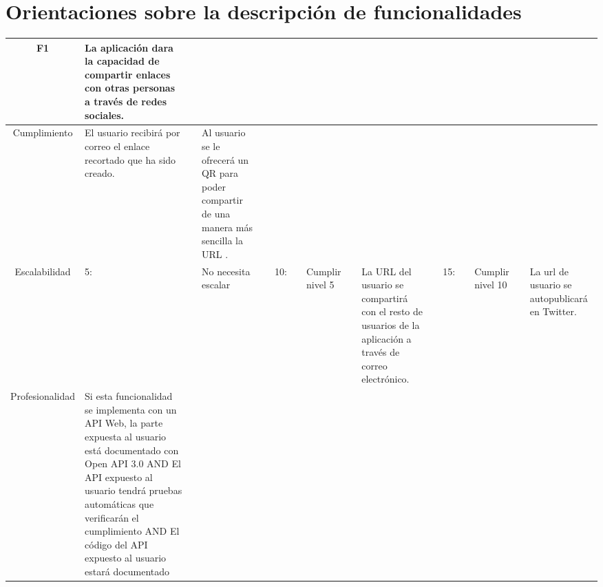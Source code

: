 \documentclass{article}
\begin{document}
\pagebreak
 
\section*{Orientaciones sobre la descripción de funcionalidades}
 
 
\begin{table}[hbtp]
    \footnotesize
    \centering
    \settowidth{}
    \setlength\extrarowheight{5pt}
    \begin{tabulary}{\textwidth}{ C L }
        \textbf{F1} & La aplicación dara la capacidad de compartir enlaces con otras personas a través de redes sociales.
        \\
    \hline
    
    Cumplimiento &
      \quad El usuario recibirá por correo el enlace recortado que ha sido creado. &&

      \quad Al usuario se le ofrecerá un QR para poder compartir de una manera más sencilla la URL . \\
        
    Escalabilidad & 
    5: && 
        \quad {} \quad No necesita escalar &&
    10: &&
        \quad {} \quad Cumplir nivel 5 && 
        \quad {} \quad La URL del usuario se compartirá con el resto de usuarios de la aplicación a través de correo electrónico. && 
    15: &&
        \quad {} \quad Cumplir nivel 10 &&
        \quad {} \quad La url de usuario se autopublicará en Twitter.\\
 
    Profesionalidad &
    
    Si esta funcionalidad se implementa con un API Web, la parte expuesta al usuario está documentado con Open API 3.0 AND El API expuesto al usuario tendrá pruebas automáticas que verificarán el cumplimiento AND El código del API expuesto al usuario estará documentado\\
 
    \end{tabulary}
\end{table}
 
\end{document}
